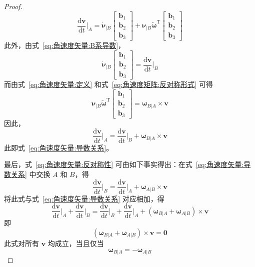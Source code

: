 \begin{proof}
\begin{equation}
    \frac{\mathrm{d}\bm{v}}{\mathrm{d}t}\Big|_A
    = \dot{\bm{\nu}}_{|B}\begin{bmatrix}\mathbf{b}_1 \\ \mathbf{b}_2 \\ \mathbf{b}_3\end{bmatrix}
    + \bm{\nu}_{|B}\bm{\tilde{\omega}}^{\mathrm{T}}\begin{bmatrix}\mathbf{b}_1 \\ \mathbf{b}_2 \\ \mathbf{b}_3\end{bmatrix}
\end{equation}
此外，由式~\eqref{eq:角速度矢量:B系导数}，
\begin{equation}
    \dot{\bm{\nu}}_{|B}\begin{bmatrix}\mathbf{b}_1 \\ \mathbf{b}_2 \\ \mathbf{b}_3\end{bmatrix} = \frac{\mathrm{d}\bm{v}}{\mathrm{d}t}\Big|_B
\end{equation}
而由式~\eqref{eq:角速度矢量:定义} 和式~\eqref{eq:角速度矩阵:反对称形式} 可得
\begin{equation}
    \bm{\nu}_{|B}\bm{\tilde{\omega}}^{\mathrm{T}}\begin{bmatrix}\mathbf{b}_1 \\ \mathbf{b}_2 \\ \mathbf{b}_3\end{bmatrix} = \bm{\omega}_{B|A}\times\bm{v}
\end{equation}
因此，
\begin{equation}
    \frac{\mathrm{d}\bm{v}}{\mathrm{d}t}\Big|_A = \frac{\mathrm{d}\bm{v}}{\mathrm{d}t}\Big|_B + \bm{\omega}_{B|A}\times\bm{v}
\end{equation}
此即式~\eqref{eq:角速度矢量:导数关系}。

最后，式~\eqref{eq:角速度矢量:反对称性} 可由如下事实得出：在式~\eqref{eq:角速度矢量:导数关系} 中交换 $A$ 和 $B$，得
\begin{equation}
    \frac{\mathrm{d}\bm{v}}{\mathrm{d}t}\Big|_B = \frac{\mathrm{d}\bm{v}}{\mathrm{d}t}\Big|_A + \bm{\omega}_{A|B}\times\bm{v}
\end{equation}
将此式与式~\eqref{eq:角速度矢量:导数关系} 对应相加，得
\begin{equation}
    \frac{\mathrm{d}\bm{v}}{\mathrm{d}t}\Big|_A + \frac{\mathrm{d}\bm{v}}{\mathrm{d}t}\Big|_B
    = \frac{\mathrm{d}\bm{v}}{\mathrm{d}t}\Big|_B + \frac{\mathrm{d}\bm{v}}{\mathrm{d}t}\Big|_A
    + (\bm{\omega}_{B|A} + \bm{\omega}_{A|B})\times\bm{v}
\end{equation}
即
\begin{equation}
    (\bm{\omega}_{B|A} + \bm{\omega}_{A|B})\times\bm{v} = \bm{0}
\end{equation}
此式对所有 $\bm{v}$ 均成立，当且仅当
\begin{equation}
    \bm{\omega}_{B|A} = -\bm{\omega}_{A|B}
\end{equation}

\end{proof}

